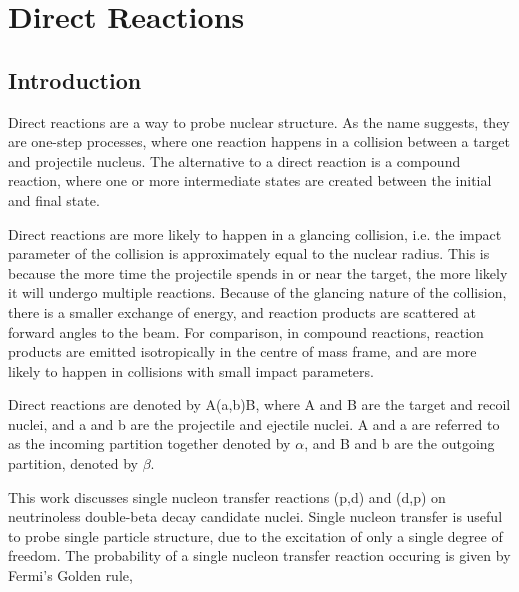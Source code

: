 
\chapter{Direct Reactions} %

\label{Chapter3} %



\section{Introduction}

Direct reactions are a way to probe nuclear structure. As the name suggests, they are one-step processes, where one reaction happens in a collision between a target and projectile nucleus. The alternative to a direct reaction is a compound reaction, where one or more intermediate states are created between the initial and final state.

Direct reactions are more likely to happen in a glancing collision, i.e. the impact parameter of the collision is approximately equal to the nuclear radius. This is because the more time the projectile spends in or near the target, the more likely it will undergo multiple reactions. Because of the glancing nature of the collision, there is a smaller exchange of energy, and reaction products are scattered at forward angles to the beam. For comparison, in compound reactions, reaction products are emitted isotropically in the centre of mass frame, and are more likely to happen in collisions with small impact parameters.

Direct reactions are denoted by A(a,b)B, where A and B are the target and recoil nuclei, and a and b are the projectile and ejectile nuclei. A and a are referred to as the incoming partition together denoted by $\alpha$, and B and b are the outgoing partition, denoted by $\beta$.

This work discusses single nucleon transfer reactions (p,d) and (d,p) on neutrinoless double-beta decay candidate nuclei. Single nucleon transfer is useful to probe single particle structure, due to the excitation of only a single degree of freedom. The probability of a single nucleon transfer reaction occuring is given by Fermi's Golden rule,

